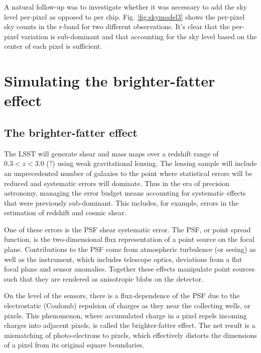 A natural follow-up was to investigate whether it was necessary to add the sky level per-pixel as opposed to per chip. Fig. \ref{fig:skymodel3} shows the per-pixel sky counts in the r-band for two different observations. It's clear that the per-pixel variation is sub-dominant and that accounting for the sky level based on the center of each pixel is sufficient. 

\section{Simulating the brighter-fatter effect}

\subsection{The brighter-fatter effect}

The LSST will generate shear and mass maps over a redshift range of $0.3<z<3.0$ (?) using weak gravitational lensing. The lensing sample will include an unprecedented number of galaxies to the point where statistical errors will be reduced and systematic errors will dominate. Thus in the era of precision astronomy, managing the error budget means accounting for systematic effects that were previously sub-dominant. This includes, for example, errors in the estimation of redshift and cosmic shear. 

One of these errors is the PSF shear systematic error. The PSF, or point spread function, is the two-dimensional flux representation of a point source on the focal plane. Contributions to the PSF come from atmospheric turbulence (or seeing) as well as the instrument, which includes telescope optics, deviations from a flat focal plane and sensor anomalies. Together these effects manipulate point sources such that they are rendered as anisotropic blobs on the detector. 

On the level of the sensors, there is a flux-dependence of the PSF due to the electrostatic (Coulomb) repulsion of charges as they near the collecting wells, or pixels. This phenomenon, where accumulated charge in a pixel repels incoming charges into adjacent pixels, is called the brighter-fatter effect. The net result is a mismatching of photo-electrons to pixels, which effectively distorts the dimensions of a pixel from its original square boundaries.

